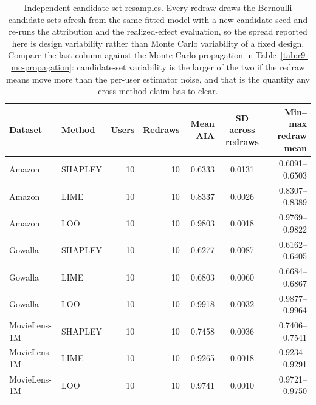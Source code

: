 \begin{table}[!htbp]\centering\scriptsize\setlength{\tabcolsep}{3pt}
\caption{Independent candidate-set resamples. Every redraw draws the Bernoulli candidate sets afresh from the same fitted model with a new candidate seed and re-runs the attribution and the realized-effect evaluation, so the spread reported here is design variability rather than Monte Carlo variability of a fixed design. Compare the last column against the Monte Carlo propagation in Table~\ref{tab:r9-mc-propagation}: candidate-set variability is the larger of the two if the redraw means move more than the per-user estimator noise, and that is the quantity any cross-method claim has to clear.}
\label{tab:r9-candidate-redraw}
\begin{tabular}{@{}llrrrcr@{}}
\toprule
Dataset & Method & Users & Redraws & Mean AIA & SD across redraws & Min--max redraw mean \\
\midrule
Amazon & SHAPLEY & 10 & 10 & 0.6333 & 0.0131 & 0.6091--0.6503 \\
Amazon & LIME & 10 & 10 & 0.8337 & 0.0026 & 0.8307--0.8389 \\
Amazon & LOO & 10 & 10 & 0.9803 & 0.0018 & 0.9769--0.9822 \\
Gowalla & SHAPLEY & 10 & 10 & 0.6277 & 0.0087 & 0.6162--0.6405 \\
Gowalla & LIME & 10 & 10 & 0.6803 & 0.0060 & 0.6684--0.6867 \\
Gowalla & LOO & 10 & 10 & 0.9918 & 0.0032 & 0.9877--0.9964 \\
MovieLens-1M & SHAPLEY & 10 & 10 & 0.7458 & 0.0036 & 0.7406--0.7541 \\
MovieLens-1M & LIME & 10 & 10 & 0.9265 & 0.0018 & 0.9234--0.9291 \\
MovieLens-1M & LOO & 10 & 10 & 0.9741 & 0.0010 & 0.9721--0.9750 \\
\bottomrule
\end{tabular}
\end{table}


